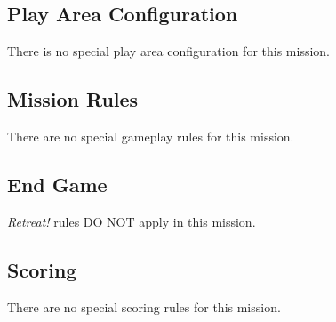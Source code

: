 \label{mission:annihilation}

\subsection{Play Area Configuration}

There is no special play area configuration for this mission.

\subsection{Mission Rules}

There are no special gameplay rules for this mission.

\subsection{End Game}

\emph{Retreat!} rules DO NOT apply in this mission.

\subsection{Scoring}

There are no special scoring rules for this mission.

